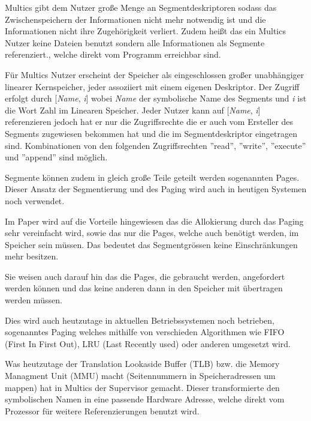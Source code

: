 \documentclass[german, 9pt,technote]{IEEEtran}
\begin{document}
		    Multics gibt dem Nutzer gro\ss e Menge an Segmentdeskriptoren sodass das Zwischenspeichern der Informationen nicht mehr notwendig ist und 
		    die Informationen nicht ihre Zugeh\"origkeit verliert. Zudem hei\ss t das ein Multics Nutzer keine Dateien benutzt sondern alle Informationen
		    als Segmente referenziert., welche direkt vom Programm erreichbar sind.
		 
        F\"ur Multics Nutzer erscheint der Speicher als eingeschlossen gro\ss er unabh\"angiger linearer Kernspeicher,
        jeder assoziiert mit einem eigenen Deskriptor. 
        Der Zugriff erfolgt durch [\textit{Name}, \textit{i}] wobei \textit{Name} der symbolische Name des Segments und \textit{i} ist die Wort Zahl
        im Linearen Speicher. Jeder Nutzer kann auf [\textit{Name}, \textit{i}] referenzieren jedoch hat er nur die Zugriffsrechte die er auch vom Ersteller
	      des Segments zugewiesen bekommen hat und die im Segmentdeskriptor eingetragen sind.
	      Kombinationen von den folgenden Zugriffsrechten ''read'', ''write'', ''execute'' und ''append'' sind m\"oglich.
	 
	      Segmente k\"onnen zudem in gleich gro\ss e Teile geteilt werden sogenannten Pages. Dieser Ansatz der Segmentierung
	      und des Paging wird auch in heutigen Systemen noch verwendet.
	     
	      Im Paper \cite{inproc:multics} wird auf die Vorteile hingewiesen das die Allokierung durch das Paging sehr vereinfacht wird,
	      sowie das nur die Pages, welche auch ben\"otigt werden, im Speicher sein m\"ussen. 
	      Das bedeutet das Segmentgr\"ossen keine Einschr\"ankungen mehr besitzen.
	     
	      Sie weisen auch darauf hin das die Pages, die gebraucht werden, angefordert werden k\"onnen und das keine anderen dann in 
	      den Speicher mit \"ubertragen werden m\"ussen.
	     
	      Dies wird auch heutzutage in aktuellen Betriebssystemen noch betrieben, sogenanntes Paging welches mithilfe von
	      verschieden Algorithmen wie FIFO (First In First Out), LRU (Last Recently used) oder anderen umgesetzt wird.
	 
	      Was heutzutage der Translation Lookaside Buffer (TLB) bzw. die Memory Managment Unit (MMU) macht
	      (Seitennummern in Speicheradressen um mappen) hat in Multics der Supervisor gemacht.
	      Dieser transformierte den symbolischen Namen in eine passende Hardware Adresse, welche direkt vom Prozessor f\"ur weitere Referenzierungen benutzt wird.
	 
\end{document}
